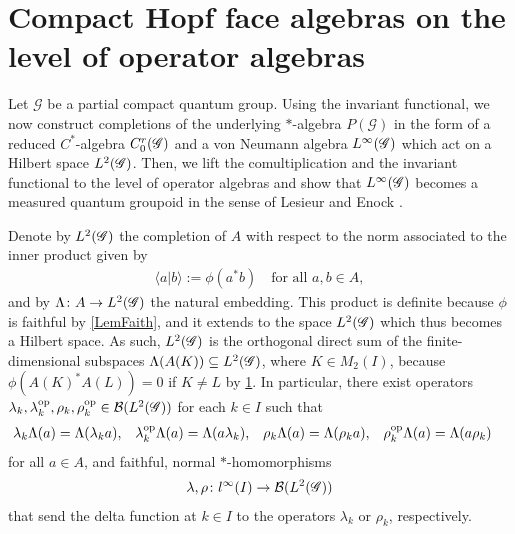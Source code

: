 \section{Compact Hopf face algebras on the level of operator algebras}


Let $\mathscr{G}$ be a partial compact quantum group. Using the
invariant functional, we now construct completions of the underlying
$*$-algebra $P(\mathscr{G})$ in the form of a reduced $C^{*}$-algebra $C^{r}_{0}(\mathscr{G})$
and a von Neumann algebra $L^{\infty}(\mathscr{G})$ which act on a Hilbert space
$L^{2}(\mathscr{G})$. Then, we lift the  comultiplication and the invariant
functional to the level of operator algebras and show that $L^{\infty}(\mathscr{G})$ becomes a measured
quantum groupoid in the sense of Lesieur \cite{} and Enock \cite{}.


Denote by $L^{2}(\mathscr{G})$ the completion of $A$ with respect to the norm
associated to the inner product given by
\begin{align*}
  \langle a|b\rangle :=\phi(a^{*}b) \quad \text{for all } a,b\in A,
\end{align*}
and by $\Lambda \colon A \to L^{2}(\mathscr{G})$ the natural embedding.  This
product is definite because $\phi$ is faithful by \ref{LemFaith}, and
it extends to the space $L^{2}(\mathscr{G})$ which thus becomes a Hilbert space.
As such, $L^{2}(\mathscr{G})$ is the
orthogonal direct sum of the finite-dimensional subspaces
$\Lambda(A(K)) \subseteq L^{2}(\mathscr{G})$, where $K\in M_{2}(I)$, because
$\phi(A(K)^{*}A(L)) = 0$ if $K\neq L$ by \ref{}.  In particular, there
exist  operators
$\lambda_{k},\lambda_{k}^{\operatorname{\mathrm{op}}},\rho_{k},\rho_{k}^{\operatorname{\mathrm{op}}}\in {\cal
  B}(L^{2}(\mathscr{G}))$ for each $k\in I$ such that
\begin{align*}
  \lambda_{k}\Lambda(a)&= \Lambda(\lambda_{k} a), &
  \lambda^{\operatorname{\mathrm{op}}}_{k}\Lambda(a) &= \Lambda(a\lambda_{k}), &
  \rho_{k}\Lambda(a) &= \Lambda(\rho_{k}a), &
  \rho_{k}^{\operatorname{\mathrm{op}}}\Lambda(a) &= \Lambda(a\rho_{k})
\end{align*}
for all $a\in A$, and faithful, normal $*$-homomorphisms
\begin{align} \label{eq:vn-lambda-rho}
  \lambda,\rho \colon l^{\infty}(I) \to
  {\cal B}(L^{2}(\mathscr{G}))
\end{align}
that send the delta function at
$k\in I$ to the operators $\lambda_{k}$ or $\rho_{k}$, respectively. 

